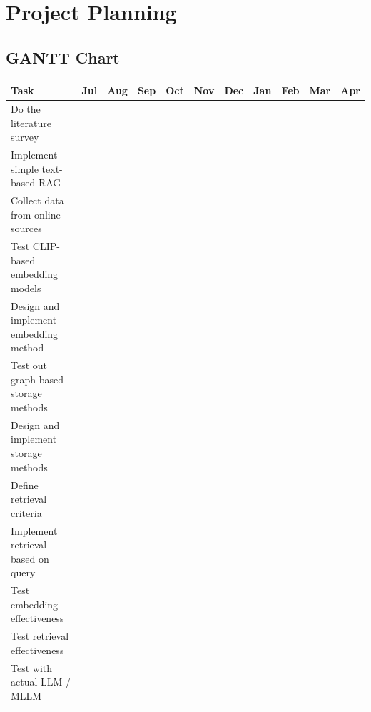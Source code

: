 \section{Project Planning}

\subsection{GANTT Chart}
\onehalfspacing
\begin{center}
    \begin{tabularx}{\textwidth}{|X|c|c|c|c|c|c|c|c|c|c|}
        \hline
        \textbf{Task} & Jul & Aug & Sep & Oct & Nov & Dec & Jan & Feb & Mar & Apr \\
        \hline
        Do the literature survey & \cellcolor{lightgray} & \cellcolor{lightgray} & \cellcolor{lightgray} & & & & & & & \\
        \hline
        Implement simple text-based RAG & & & \cellcolor{lightgray} & \cellcolor{lightgray} & & & & & & \\
        \hline
        Collect data from online sources & & & \cellcolor{lightgray} & \cellcolor{lightgray} & & & & & & \\
        \hline
        Test CLIP-based embedding models & & & & \cellcolor{lightgray} & & & & & & \\
        \hline
        Design and implement embedding method & & & & \cellcolor{lightgray} & \cellcolor{lightgray} & \cellcolor{lightgray} & & & & \\
        \hline
        Test out graph-based storage methods & & & & & \cellcolor{lightgray} & \cellcolor{lightgray} & & & & \\
        \hline
        Design and implement storage methods & & & & & \cellcolor{lightgray} & \cellcolor{lightgray} & \cellcolor{lightgray} & & & \\
        \hline
        Define retrieval criteria & & & & & & \cellcolor{lightgray} & \cellcolor{lightgray} & & & \\
        \hline
        Implement retrieval based on query & & & & & & & \cellcolor{lightgray} & \cellcolor{lightgray} & \cellcolor{lightgray} & \\
        \hline
        Test embedding effectiveness & & & & & \cellcolor{lightgray} & \cellcolor{lightgray} & & & & \\
        \hline
        Test retrieval effectiveness & & & & & & & & \cellcolor{lightgray} & \cellcolor{lightgray} & \\
        \hline
        Test with actual LLM / MLLM & & & & & & & & \cellcolor{lightgray} & \cellcolor{lightgray} & \cellcolor{lightgray} \\

\end{tabularx}
\end{center}
